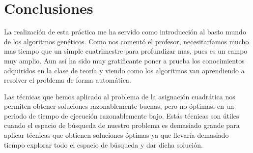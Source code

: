 \chapter{Conclusiones}


La realización de esta práctica me ha servido como introducción al basto mundo de los algoritmos genéticos. Como nos comentó el profesor, necesitaríamos mucho mas tiempo que un simple cuatrimestre para profundizar mas, pues es un  campo muy amplio. Aun así ha sido muy gratificante poner a prueba los conocimientos adquiridos en la clase de teoría y viendo como los algoritmos van aprendiendo a resolver el problema de forma automática.

\bigskip
Las técnicas que hemos aplicado al problema de la asignación cuadrática nos permiten obtener soluciones razonablemente buenas, pero no óptimas, en un periodo de tiempo de ejecución razonablemente bajo. Estás técnicas son útiles cuando el espacio de búsqueda de nuestro problema es demasiado grande para aplicar técnicas que obtienen soluciones óptimas ya que llevaría demasiado tiempo explorar todo el espacio de búsqueda y dar dicha solución.